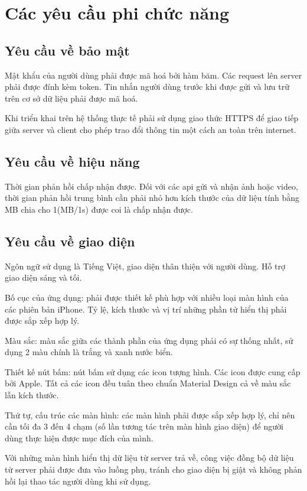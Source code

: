 \documentclass[../DoAn.tex]{subfiles}
\begin{document}
\section{Các yêu cầu phi chức năng}
\label{section:2.5}
\subsection{Yêu cầu về bảo mật}
Mật khẩu của người dùng phải được mã hoá bởi hàm băm. Các request lên server phải được đính kèm token. Tin nhắn người dùng trước khi được gửi và lưu trữ trên cơ sở dữ liệu phải được mã hoá.

Khi triển khai trên hệ thống thực tế phải sử dụng giao thức HTTPS để giao tiếp giữa server và client cho phép trao đổi thông tin một cách an toàn trên internet. 
\subsection{Yêu cầu về hiệu năng}
Thời gian phản hồi chấp nhận được. Đối với các api gửi và nhận ảnh hoặc video, thời gian phản hồi trung bình cần phải nhỏ hơn kích thước của dữ liệu tính bằng MB chia cho 1(MB/1s) được coi là chấp nhận được.
\subsection{Yêu cầu về giao diện}
Ngôn ngữ sử dụng là Tiếng Việt, giao diện thân thiện với người dùng. Hỗ trợ giao diện sáng và tối. 

Bố cục của ứng dụng: phải được thiết kế phù hợp với nhiều loại màn hình của các phiên bản iPhone. Tỷ lệ, kích thước và vị trí những phần tử hiển thị phải được sắp xếp hợp lý. 

Màu sắc: màu sắc giữa các thành phần của ứng dụng phải có sự thống nhất, sử dụng 2 màu chính là trắng và xanh nước biển.

Thiết kế nút bấm: nút bấm sử dụng các icon tượng hình. Các icon được cung cấp bởi Apple. Tất cả các icon đều tuân theo chuẩn Material Design cả về màu sắc lẫn kích thước.

Thứ tự, cấu trúc các màn hình: các màn hình phải được sắp xếp hợp lý, chỉ nên cần tối đa 3 đến 4 chạm (số lần tương tác trên màn hình giao diện) để người dùng thực hiện được mục đích của mình.

Với những màn hình hiển thị dữ liệu từ server trả về, công việc đồng bộ dữ liệu từ server phải được đưa vào luồng phụ, tránh cho giao diện bị giật và không phản hồi lại thao tác người dùng khi sử dụng.
\end{document}
